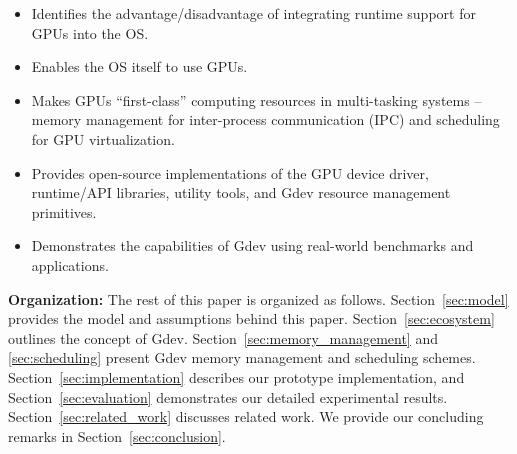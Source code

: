 \begin{itemize}
 \vspace{-0.25em}
 \item Identifies the advantage/disadvantage of integrating runtime
       support for GPUs into the OS.
 \vspace{-0.5em}
 \item Enables the OS itself to use GPUs.
 \vspace{-0.5em}
 \item Makes GPUs ``first-class'' computing resources in multi-tasking
       systems -- memory management for inter-process communication
       (IPC) and scheduling for GPU virtualization.
 \vspace{-0.5em}
 \item Provides open-source implementations of the GPU device driver,
       runtime/API libraries, utility tools, and Gdev resource
       management primitives.
 \vspace{-0.5em}
 \item Demonstrates the capabilities of Gdev using real-world benchmarks
       and applications.
 \vspace{-0.25em}
\end{itemize}

\textbf{Organization:}
The rest of this paper is organized as follows.
Section~\ref{sec:model} provides the model and assumptions behind
this paper.
Section~\ref{sec:ecosystem} outlines the concept of Gdev.
Section~\ref{sec:memory_management} and \ref{sec:scheduling} present
Gdev memory management and scheduling schemes.
Section~\ref{sec:implementation} describes our prototype implementation,
and Section~\ref{sec:evaluation} demonstrates our detailed experimental
results.
Section~\ref{sec:related_work} discusses related work.
We provide our concluding remarks in Section~\ref{sec:conclusion}.
